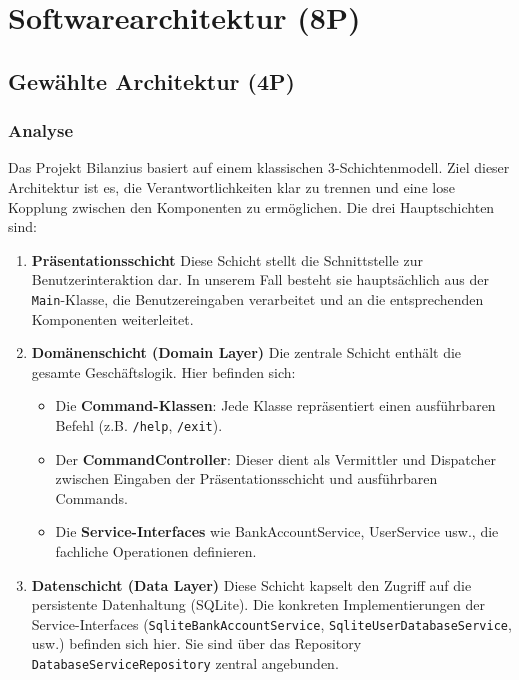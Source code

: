 \section{Softwarearchitektur (8P)}

\subsection{Gewählte Architektur (4P)}

\subsubsection*{Analyse}
Das Projekt Bilanzius basiert auf einem klassischen 3-Schichtenmodell. Ziel dieser Architektur ist es, die Verantwortlichkeiten klar zu trennen und eine lose Kopplung zwischen den Komponenten zu ermöglichen. Die drei Hauptschichten sind:
\begin{enumerate}
    \item \textbf{Präsentationsschicht} \newline 
    Diese Schicht stellt die Schnittstelle zur Benutzerinteraktion dar. In unserem Fall besteht sie hauptsächlich aus der \texttt{Main}-Klasse, die Benutzereingaben verarbeitet und an die entsprechenden Komponenten weiterleitet.
    \item \textbf{Domänenschicht (Domain Layer)} \newline
    Die zentrale Schicht enthält die gesamte Geschäftslogik. Hier befinden sich:
    \begin{itemize}
        \item 
        Die \textbf{Command-Klassen}: Jede Klasse repräsentiert einen ausführbaren Befehl (z.B. \texttt{/help}, \texttt{/exit}).
        \item 
        Der \textbf{CommandController}: Dieser dient als Vermittler und Dispatcher zwischen Eingaben der Präsentationsschicht und ausführbaren Commands.
        \item 
        Die \textbf{Service-Interfaces} wie BankAccountService, UserService usw., die fachliche Operationen definieren.
    \end{itemize}
    \item \textbf{Datenschicht (Data Layer)} \newline
    Diese Schicht kapselt den Zugriff auf die persistente Datenhaltung (SQLite). Die konkreten Implementierungen der Service-Interfaces (\texttt{SqliteBankAccountService}, \texttt{SqliteUserDatabaseService}, usw.) befinden sich hier. Sie sind über das Repository \texttt{DatabaseServiceRepository} zentral angebunden.
\end{enumerate}

